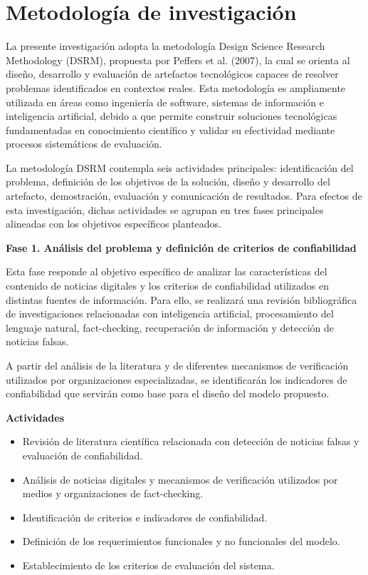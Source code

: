 \documentclass[12pt]{article}
\begin{document}
\section{Metodología de investigación}

La presente investigación adopta la metodología Design Science Research Methodology (DSRM), propuesta por Peffers et al. (2007), la cual se orienta al diseño, desarrollo y evaluación de artefactos tecnológicos capaces de resolver problemas identificados en contextos reales. Esta metodología es ampliamente utilizada en áreas como ingeniería de software, sistemas de información e inteligencia artificial, debido a que permite construir soluciones tecnológicas fundamentadas en conocimiento científico y validar su efectividad mediante procesos sistemáticos de evaluación.

La metodología DSRM contempla seis actividades principales: identificación del problema, definición de los objetivos de la solución, diseño y desarrollo del artefacto, demostración, evaluación y comunicación de resultados. Para efectos de esta investigación, dichas actividades se agrupan en tres fases principales alineadas con los objetivos específicos planteados.

\textbf{Fase 1. Análisis del problema y definición de criterios de confiabilidad}

Esta fase responde al objetivo específico de analizar las características del contenido de noticias digitales y los criterios de confiabilidad utilizados en distintas fuentes de información. Para ello, se realizará una revisión bibliográfica de investigaciones relacionadas con inteligencia artificial, procesamiento del lenguaje natural, fact-checking, recuperación de información y detección de noticias falsas.

A partir del análisis de la literatura y de diferentes mecanismos de verificación utilizados por organizaciones especializadas, se identificarán los indicadores de confiabilidad que servirán como base para el diseño del modelo propuesto.

\textbf{Actividades}

\begin{itemize}
    \item Revisión de literatura científica relacionada con detección de noticias falsas y evaluación de confiabilidad.
    \item Análisis de noticias digitales y mecanismos de verificación utilizados por medios y organizaciones de fact-checking.
    \item Identificación de criterios e indicadores de confiabilidad.
    \item Definición de los requerimientos funcionales y no funcionales del modelo.
    \item Establecimiento de los criterios de evaluación del sistema.
\end{itemize}
\end{document}
